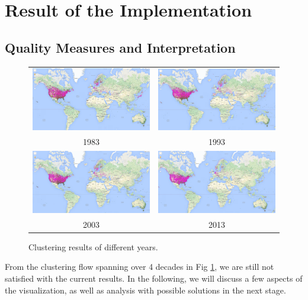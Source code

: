 \section{Result of the Implementation}
\subsection{Quality Measures and Interpretation}
\begin{figure}
    \centering
    \begin{tabular}{c c}
        \includegraphics[width =.4\linewidth]{figure/1983.png} &         \includegraphics[width =.4\linewidth]{figure/1993.png} \\
        1983 & 1993 \\
        \includegraphics[width =.4\linewidth]{figure/2003.png} &         \includegraphics[width =.4\linewidth]{figure/2013.png} \\
        2003 & 2013
    \end{tabular}
    \caption{Clustering results of different years.}
    \label{fig:ClusteringFlow}
\end{figure}

From the clustering flow spanning over 4 decades in Fig \ref{fig:ClusteringFlow}, we are still not satisfied with the current results. In the following, we will discuss a few aspects of the visualization, as well as analysis with possible solutions in the next stage.

